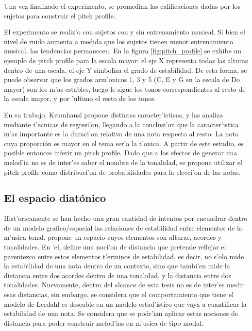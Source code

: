 Una vez finalizado el experimento, se promedian las calificaciones dadas por los sujetos para construir el pitch profile.

El experimento se realiz'o con sujetos con y sin entrenamiento musical. Si bien el nivel de ruido aumenta a medida que los sujetos 
tienen menor entrenamiento musical, las tendencias permanecen. En la figura \ref{fig:pitch_profile} se exhibe un ejemplo de pitch profile para la escala mayor: 
el eje X representa todas las alturas dentro de una escala, el eje Y simboliza el grado de estabilidad. De esta forma, se puede observar que los grados arm'onicos
1, 3 y 5 (C, E y G en la escala de Do mayor) son los m'as estables, luego le sigue los tonos correspondientes al resto de la escala mayor, y por 'ultimo el resto de los 
tonos.


\begin{imagen}
    \width{10cm}
\end{imagen}


En su trabajo, Krumhansl propone distintas caracter'isticas, y las analiza mediante t'ecnicas de regresi'on, llegando a la conclusi'on que la
caracter'istica m'as importante es la duraci'on relativa de una nota respecto al resto: La nota cuya proporci\'on es mayor en el tema ser'a la t'onica. A partir de este 
estudio, es posible entonces inferir un pitch profile. Dado que a los efectos de generar una melod'ia no es de inter'es saber el nombre de la tonalidad, se propone 
utilizar el pitch profile como distribuci'on de probabilidades para la elecci'on de las notas.

\subsection{El espacio diat\'onico}
Hist'oricamente se han hecho una gran cantidad de intentos por encuadrar dentro de un modelo grafico/espacial las relaciones de estabilidad entre elementos de la m'usica
tonal.  \cite{Lerdahl2001} propone un espacio cuyos elementos son alturas, acordes y tonalidades. En 'el, define una noci'on de distancia que pretende 
reflejar el parentezco entre estos elementos t'erminos de estabilidad, es decir, no s'olo mide la estabilidad de una nota dentro de un contexto, 
sino que tambi'en mide la distancia entre dos acordes dentro de una tonalidad, y la distancia entre dos tonalidades. 
Nuevamente, dentro del alcance de esta tesis no es de inter'es medir esas distancias, sin embargo, se considera que el comportamiento que tiene el modelo de Lerdahl es deseable en un modelo estad'istico
que vaya a cuantificar la estabilidad de una nota. Se considera que se podr'ian aplicar estas nociones de distancia para poder construir melod'ias en m'usica de 
tipo modal.

